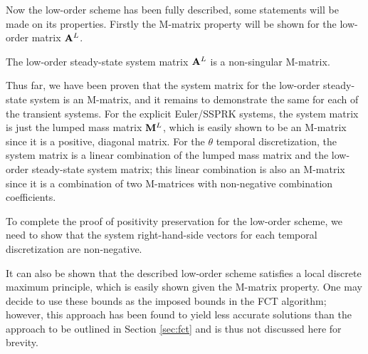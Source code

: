 Now the low-order scheme has been fully described, some statements will be
made on its properties. Firstly the M-matrix property will be shown for the low-order
matrix $\mathbf{A}^L$.
\begin{thm}
  The low-order steady-state system matrix $\mathbf{A}^L$ is a non-singular M-matrix.
\end{thm}

Thus far, we have been proven that the system matrix for the low-order steady-state
system is an M-matrix, and it remains to demonstrate the same for each of the
transient systems. For the explicit Euler/SSPRK systems, the system matrix
is just the lumped mass matrix $\mathbf{M}^L$, which is easily shown to be an M-matrix
since it is a positive, diagonal matrix. For the $\theta$ temporal
discretization, the system matrix is a linear combination of the lumped mass
matrix and the low-order steady-state system matrix; this linear combination
is also an M-matrix since it is a combination of two M-matrices with non-negative
combination coefficients.

To complete the proof of positivity preservation for the low-order scheme, 
we need to show that
the system right-hand-side vectors for each temporal discretization are
non-negative.


It can also be shown that the described low-order scheme satisfies a local
discrete maximum principle, which is easily shown given the M-matrix property.
One may decide to use these bounds as the imposed bounds in the FCT
algorithm; however, this approach has been found to yield less accurate solutions
than the approach to be outlined in Section \ref{sec:fct} and is thus not discussed here 
for brevity.
